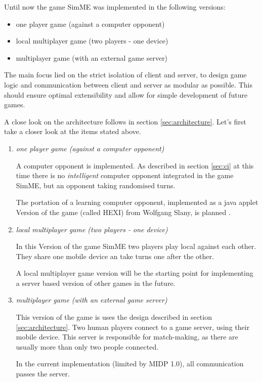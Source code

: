 	Until now the game SimME was implemented in the following versions:

	\begin{itemize}
		\item one player game (against a computer opponent)
		\item local multiplayer game (two players - one device)
		\item multiplayer game (with an external game server)
	\end{itemize}

	The main focus lied on the strict isolation of client and server, to design
	game logic and communication between client and server as modular as
	possible. This should ensure optimal extensibility and allow for simple
	development of future games.

	A close look on the architecture follows in section \ref{sec:architecture}.
	Let's first take a closer look at the items stated above.

	\begin{enumerate}

		\item \textit{one player game (against a computer opponent)}

			A computer opponent is implemented. As described in section
			\ref{sec:ci} at this time there is no \textit{intelligent} computer
			opponent integrated in the game SimME, but an opponent taking
			randomised turns.

			The portation of a learning computer opponent, implemented as a java
			applet Version of the game (called HEXI) from Wolfgang Slany, is
			planned \cite{slany_paper}.

		\item \textit{local multiplayer game (two players - one device)}

			In this Version of the game SimME two players play local against
			each other. They share one mobile device an take turns one after the
			other.

			A local multiplayer game version will be the starting point
			for implementing a server based version of other games in the
			future.

		\item \textit{multiplayer game (with an external game server)}

			This version of the game is uses the design described in section
			\ref{sec:architecture}. Two human players connect to a game server,
			using their mobile device. This server is responsible for
			match-making, as there are usually more than only two people
			connected.

			In the current implementation (limited by MIDP 1.0), all
			communication passes the server.

	\end{enumerate}

